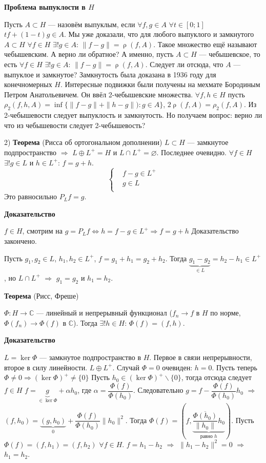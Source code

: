 \documentclass[12pt]{article}
\DeclareMathOperator{\rh}{\rho}
\begin{document}
\textbf{Проблема выпуклости в $H$}

Пусть $A\subset H$ --- назовём выпуклым, если $\forall f,g\in A$ $\forall t\in[0;1]$ $tf+(1-t)g\in A$.
Мы уже доказали, что для любого выпуклого и замкнутого $A\subset H$ $\forall f\in H$ $\exists!g\in A$: $\|f-g\|=\rh(f,A)$.
Такое множество ещё называют чебышевским.
А верно ли обратное? А именно, пусть $A\subset H$ --- чебышевское, то есть $\forall f\in H$ $\exists!g\in A$: $\|f-g\|=\rh(f,A)$. 
Следует ли отсюда, что $A$ --- выпуклое и замкнутое?
Замкнутость была доказана в 1936 году для конечномерных $H$.
Интересные подвижки были получены на мехмате Бородиным Петром Анатольевичем.
Он ввёл 2-чебышевские множества.
$\forall f,h\in H$ пусть $\rho_2(f,h,A)=\inf\{\|f-g\|+\|h-g\|):g\in A\}$, $2\rh(f,A)=\rho_2(f,A)$.
Из 2-чебышевости следует выпуклость и замкнутость.
Но получаем вопрос: верно ли что из чебышевости следует 2-чебышевость?

2) \textbf{Теорема} (Рисса об ортогональном дополнении)
$L\subset H$ --- замкнутое подпространство $\Rightarrow$ $L\oplus L^+=H$ и $L\cap L^+=\varnothing$.
Последнее очевидно. 
$\forall f\in H$ $\exists! g\in L$ и $h\in L^+$: $f=g+h$.
$$
\left\{
\begin{aligned}
&f-g\in L^{+}\\
&g\in L\\
\end{aligned}
\right.
$$
Это равносильно $P_Lf=g$.

\textbf{Доказательство}

$f\in H$, смотрим на $g=P_Lf\Leftrightarrow h=f-g\in L^+\Rightarrow f=g+h$ Доказательство закончено.

Пусть $g_1,g_2\in L$, $h_1, h_2\in L^+$,  $f=g_1+h_1=g_2+h_2$.
Тогда $\underbrace{g_1-g_2}_{\in L}=h_2-h_1\in L^+$, но $L\cap L^+$ $\Rightarrow$ $g_1=g_2$ и $h_1=h_2$.

\textbf{Теорема} (Рисс, Фреше)

$\Phi:H\to\mathbb C$ --- линейный и непрерывный функционал ($f_n\to f$ в $H$ по норме, $\Phi(f_n)\to\Phi(f)$ в $\mathbb C$).
Тогда $\exists!h\in H$: $\Phi(f)=(f,h)$.

\textbf{Доказательство}

$L=\ker \Phi$ --- замкнутое подпространство в $H$.
Первое в связи непрерывности, второе в силу линейности.
$L\oplus L^+$.
Случай $\Phi=0$ очевиден: $h=0$.
Пусть теперь $\Phi\ne0\Rightarrow(\ker\Phi)^+\ne\{0\}$
Пусть $h_0\in(\ker\Phi)^+\backslash\{0\}$, тогда отсюда следует $f\in H$ $f=\underbrace{g}_{\in \ker \Phi}+\alpha h_0$, где $\alpha=\dfrac{\Phi(f)}{\Phi(h_0)}$.
Следовательно $g=f-\dfrac{\Phi(f)}{\Phi(h_0)}h_0$ $\Rightarrow$ $(f,h_0)=\underbrace{(g,h_0)}_{0}+\dfrac{\Phi(f)}{\Phi(h_0)}\|h_0\|^2$.
Тогда $\Phi(f)=(f, \underbrace{\dfrac{\overline{\Phi(h_0)}}{\|h_0\|}h_0}_{\text{равно }h})$.
Пусть $\Phi(f)=(f,h_1)=(f,h_2)$ $\forall f\in H$.
$f=h_1-h_2$ $\Rightarrow$ $\|h_1-h_2\|^2=0$ $\Rightarrow$ $h_1=h_2$.
\end{document}
